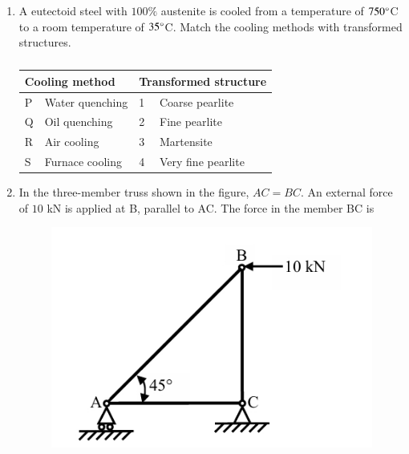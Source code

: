 \documentclass[journal,12pt,onecolumn]{IEEEtran}
\theoremstyle{remark}
\begin{document}
\begin{enumerate}
    \item A eutectoid steel with $100\%$ austenite is cooled from a temperature of $750\degree$C to a room temperature of $35\degree$C. Match the cooling methods with transformed structures.
    \begin{table}[h]
        \centering
        \caption*{}
        \label{tab:q39}
        \begin{tabular}{llll}
            \hline
            \multicolumn{2}{l}{Cooling method} & \multicolumn{2}{l}{Transformed structure} \\
            \hline
            P & Water quenching & 1 & Coarse pearlite \\
            Q & Oil quenching & 2 & Fine pearlite \\
            R & Air cooling & 3 & Martensite \\
            S & Furnace cooling & 4 & Very fine pearlite \\
            \hline
        \end{tabular}
    \end{table}

    \hfill{}
    \begin{enumerate}
    \end{enumerate}

    \item In the three-member truss shown in the figure, $AC=BC$. An external force of $10$ kN is applied at B, parallel to AC. The force in the member BC is
    \begin{figure}[h]
        \centering
        \includegraphics[width=0.4\columnwidth]{q40.png}
        \caption*{}
        \label{fig:q40}
    \end{figure}


\end{enumerate}
\end{document}
